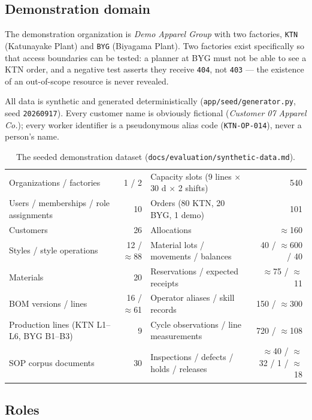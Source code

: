 \documentclass[11pt,a4paper]{article}
\begin{document}
\subsection{Demonstration domain}

The demonstration organization is \emph{Demo Apparel Group} with two factories,
\texttt{KTN} (Katunayake Plant) and \texttt{BYG} (Biyagama Plant). Two factories
exist specifically so that access boundaries can be tested: a planner at BYG
must not be able to see a KTN order, and a negative test asserts they receive
\texttt{404}, not \texttt{403} --- the existence of an out-of-scope resource is
never revealed.

All data is synthetic and generated deterministically
(\texttt{app/seed/generator.py}, seed \texttt{20260917}). Every customer name is
obviously fictional (\emph{Customer 07 Apparel Co.}); every worker identifier is
a pseudonymous alias code (\texttt{KTN-OP-014}), never a person's name.

\begin{table}[h]
\centering\small
\caption{The seeded demonstration dataset (\texttt{docs/evaluation/synthetic-data.md}).}
\begin{tabular}{@{}lr@{\hspace{2.2em}}lr@{}}
\toprule
Organizations / factories & 1 / 2 & Capacity slots (9 lines $\times$ 30 d $\times$ 2 shifts) & 540\\
Users / memberships / role assignments & 10 & Orders (80 KTN, 20 BYG, 1 demo) & 101\\
Customers & 26 & Allocations & $\approx$160\\
Styles / style operations & 12 / $\approx$88 & Material lots / movements / balances & 40 / $\approx$600 / 40\\
Materials & 20 & Reservations / expected receipts & $\approx$75 / $\approx$11\\
BOM versions / lines & 16 / $\approx$61 & Operator aliases / skill records & 150 / $\approx$300\\
Production lines (KTN L1--L6, BYG B1--B3) & 9 & Cycle observations / line measurements & 720 / $\approx$108\\
SOP corpus documents & 30 & Inspections / defects / holds / releases & $\approx$40 / $\approx$32 / 1 / $\approx$18\\
\bottomrule
\end{tabular}
\end{table}

\subsection{Roles}
\end{document}
